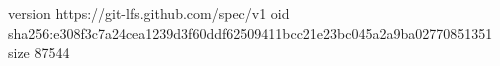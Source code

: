 version https://git-lfs.github.com/spec/v1
oid sha256:e308f3c7a24cea1239d3f60ddf62509411bcc21e23bc045a2a9ba02770851351
size 87544

